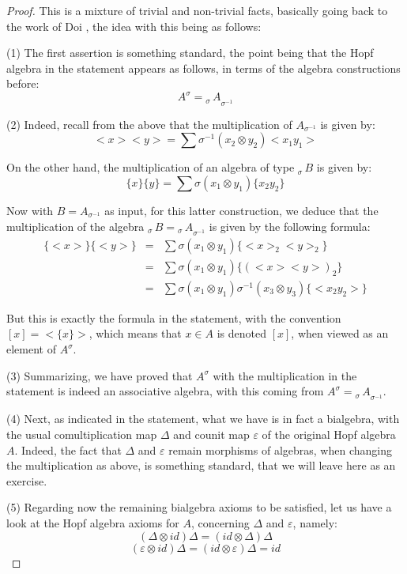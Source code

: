 \documentclass[12pt]{amsbook}
\begin{document}
\begin{proof}
This is a mixture of trivial and non-trivial facts, basically going back to the work of Doi \cite{doi}, the idea with this being as follows:

\medskip

(1) The first assertion is something standard, the point being that the Hopf algebra in the statement appears as follows, in terms of the algebra constructions before:
$$A^\sigma={_{\sigma}\!\,A}_{\sigma^{-1}}$$

(2) Indeed, recall from the above that the multiplication of $A_{\sigma^{-1}}$ is given by: 
$$<x ><y>=\sum\sigma^{-1}(x_2\otimes y_2)<x_1y_1>$$

On the other hand, the multiplication of an algebra of type $_{\sigma}\!\,B$ is given by:
$$\{x\}\{y\}=\sum\sigma(x_1\otimes y_1)\{x_2y_2\}$$ 

Now with $B=A_{\sigma^{-1}}$ as input, for this latter construction, we deduce that the multiplication of the algebra $_{\sigma}\!\,B={_{\sigma}\!\,A}_{\sigma^{-1}}$ is given by the following formula:
\begin{eqnarray*}
\{<x>\}\{<y>\}
&=&\sum\sigma(x_1\otimes y_1)\{<x>_2<y>_2\}\\
&=&\sum\sigma(x_1\otimes y_1)\{(<x><y>)_2\}\\
&=&\sum\sigma(x_1\otimes y_1)\sigma^{-1}(x_3\otimes y_3)\{<x_2y_2>\}
\end{eqnarray*}

But this is exactly the formula in the statement, with the convention $[x]=<\{x\}>$, which means that $x\in A$ is denoted $[x]$, when viewed as an element of $A^{\sigma}$.

\medskip

(3) Summarizing, we have proved that $A^\sigma$ with the multiplication in the statement is indeed an associative algebra, with this coming from $A^\sigma={_{\sigma}\!\,A}_{\sigma^{-1}}$. 

\medskip

(4) Next, as indicated in the statement, what we have is in fact a bialgebra, with the usual comultiplication map $\Delta$ and counit map $\varepsilon$ of the original Hopf algebra $A$. Indeed, the fact that $\Delta$ and $\varepsilon$ remain morphisms of algebras, when changing the multiplication as above, is something standard, that we will leave here as an exercise.

\medskip

(5) Regarding now the remaining bialgebra axioms to be satisfied, let us have a look at the Hopf algebra axioms for $A$, concerning $\Delta$ and $\varepsilon$, namely:
$$(\Delta\otimes id)\Delta=(id\otimes \Delta)\Delta$$
$$(\varepsilon\otimes id)\Delta=(id\otimes\varepsilon)\Delta=id$$


\end{proof}
\end{document}
